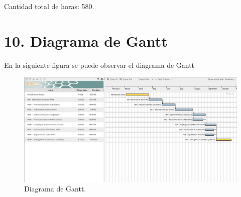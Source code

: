 \documentclass[
11pt, %
]{charter}
\begin{document}
Cantidad total de horas: 580.
\section{10. Diagrama de Gantt}
\label{sec:gantt}


En la siguiente figura se puede observar el diagrama de Gantt
\begin{figure}[htpb]
\centering 
\includegraphics[width=.99\textwidth]{./Figuras/gant.png}
\caption{Diagrama de Gantt.}
\label{fig:diagBloques}
\end{figure}
\clearpage
\end{document}
